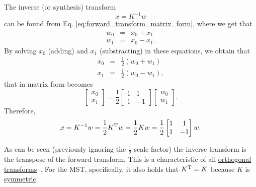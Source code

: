 The inverse (or synthesis) transform
\begin{equation}
  x = K^{-1}w
  \label{eq:inverse_transform}
\end{equation}
can be found from Eq. \ref{eq:forward_transform_matrix_form}, where we
get that
\begin{equation}
  \begin{array}{rcl}
  w_0 & = & x_0 + x_1\\
  w_1 & = & x_0 - x_1.
  \end{array}
\end{equation}
By solving $x_0$ (adding) and $x_1$ (substracting) in
these equations, we obtain that
\begin{equation}
  \begin{array}{rcl}
  x_0 & = & \frac{1}{2}(w_0 + w_1)\\
  x_1 & = & \frac{1}{2}(w_0 - w_1),
  \end{array}
\end{equation}
that in matrix form becomes
\begin{equation}
  \begin{bmatrix}
    x_0 \\
    x_1
  \end{bmatrix}
  = \frac{1}{2}
  \begin{bmatrix} 1 & 1 \\ 1 & -1 \end{bmatrix}
  \begin{bmatrix}
    w_0 \\
    w_1
  \end{bmatrix}.
\end{equation}
Therefore,
\begin{equation}
  x = K^{-1}w = \frac{1}{2}K^{\text T}w = \frac{1}{2}Kw = \frac{1}{2}\begin{bmatrix} 1 & 1 \\ 1 & -1 \end{bmatrix}w.
  \label{eq:inverse_transform_matrix_form}
\end{equation}

As can be seen (previously ignoring the $\frac{1}{2}$ scale factor)
the inverse transform is the transpose of the forward transform. This
is a characteristic of all
\href{https://en.wikipedia.org/wiki/Orthogonal_transformation}{orthogonal
  transforms}~\cite{sayood2017introduction}. For the MST,
specifically, it also holds that $K^{\text T}=K$ because $K$ is
\href{https://en.wikipedia.org/wiki/Symmetric_matrix}{symmetric}.

